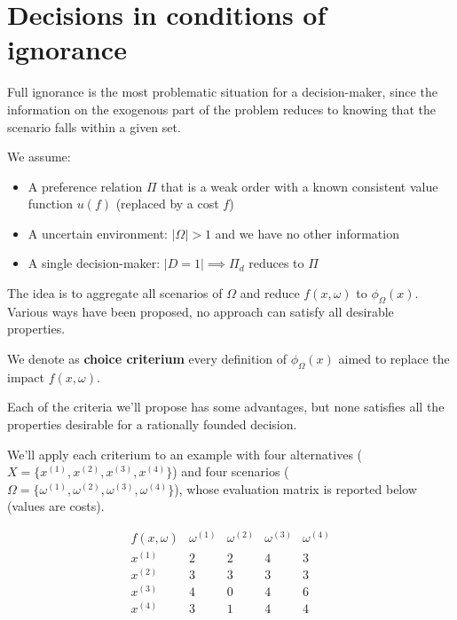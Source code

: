 \chapter{Decisions in conditions of ignorance}
\label{ch:ignorance}

Full ignorance is the most problematic situation for a decision-maker, since the information on the exogenous part of the problem reduces to knowing that the scenario falls within a given set.

We assume:
\begin{itemize}
	\item A preference relation $\Pi$ that is a weak order with a known consistent value function $u(f)$ (replaced by a cost $f$)
	
	\item A uncertain environment: $|\Omega| > 1$ and we have no other information
	
	\item A single decision-maker: $|D = 1| \implies \Pi_d$ reduces to $\Pi$
\end{itemize}

The idea is to aggregate all scenarios of $\Omega$ and reduce $f(x, \omega)$ to $\phi_\Omega (x)$. Various ways have been proposed, no approach can satisfy all desirable properties. \\

\begin{definition}
	We denote as \textbf{choice criterium} every definition of $\phi_\Omega (x)$ aimed to replace the impact $f(x, \omega)$.
\end{definition}

Each of the criteria we'll propose has some advantages, but none satisfies all the properties desirable for a rationally founded decision. 

We'll apply each criterium to an example with four alternatives ($X = \{x^{(1)}, x^{(2)}, x^{(3)}, x^{(4)}\}$) and four scenarios ($\Omega = \{\omega^{(1)}, \omega^{(2)}, \omega^{(3)}, \omega^{(4)} \}$), whose evaluation matrix is reported below (values are costs).

\begin{table}[h!]
	\centering
	\label{tab:fxomega}
	$$
	\begin{array}{c|cccc}
		f(x,\omega) & \omega^{(1)} & \omega^{(2)} & \omega^{(3)} & \omega^{(4)} \\
		\hline
		x^{(1)} & 2 & 2 & 4 & 3 \\
		x^{(2)} & 3 & 3 & 3 & 3 \\
		x^{(3)} & 4 & 0 & 4 & 6 \\
		x^{(4)} & 3 & 1 & 4 & 4 \\
	\end{array}
	$$
\end{table}


